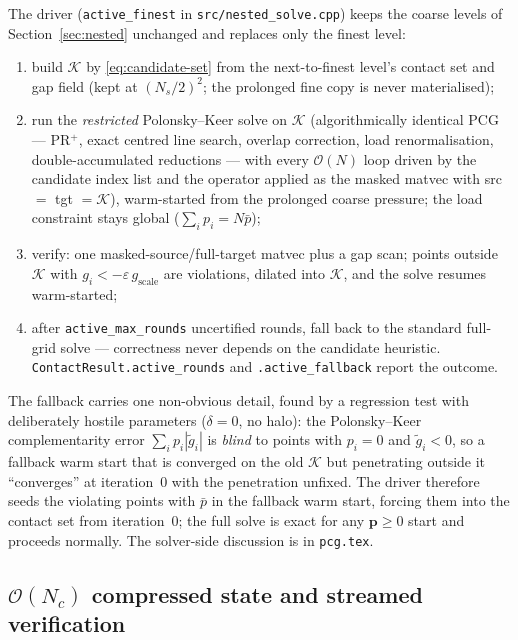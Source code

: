 \documentclass[11pt,a4paper]{article}
\newcommand{\Order}{\mathcal{O}}
\newcommand{\abs}[1]{\left\lvert #1 \right\rvert}
\newcommand{\pp}{\mathbf{p}}
\newcommand{\code}[1]{\texttt{#1}}
\theoremstyle{definition}
\theoremstyle{remark}
\begin{document}
The driver (\code{active\_finest} in \code{src/nested\_solve.cpp}) keeps the
coarse levels of Section~\ref{sec:nested} unchanged and replaces only the
finest level:
\begin{enumerate}
\item build $\mathcal K$ by \eqref{eq:candidate-set} from the next-to-finest
level's contact set and gap field (kept at $(N_s/2)^2$; the prolonged fine
copy is never materialised);
\item run the \emph{restricted} Polonsky--Keer solve on $\mathcal K$
(algorithmically identical PCG --- PR$^+$, exact centred line search,
overlap correction, load renormalisation, double-accumulated reductions ---
with every $\Order(N)$ loop driven by the candidate index list and the
operator applied as the masked matvec with src $=$ tgt $=\mathcal K$),
warm-started from the prolonged coarse pressure; the load constraint stays
global ($\sum_i p_i = N\bar p$);
\item verify: one masked-source/full-target matvec plus a gap scan;
points outside $\mathcal K$ with $g_i<-\varepsilon\,g_{\text{scale}}$ are
violations, dilated into $\mathcal K$, and the solve resumes warm-started;
\item after \code{active\_max\_rounds} uncertified rounds, fall back to the
standard full-grid solve --- correctness never depends on the candidate
heuristic. \code{ContactResult.active\_rounds} and \code{.active\_fallback}
report the outcome.
\end{enumerate}
The fallback carries one non-obvious detail, found by a regression test with
deliberately hostile parameters ($\delta=0$, no halo): the Polonsky--Keer
complementarity error $\sum_i p_i\abs{\tilde g_i}$ is \emph{blind} to points
with $p_i=0$ and $\tilde g_i<0$, so a fallback warm start that is converged
on the old $\mathcal K$ but penetrating outside it ``converges'' at
iteration~0 with the penetration unfixed. The driver therefore seeds the
violating points with $\bar p$ in the fallback warm start, forcing them into
the contact set from iteration~0; the full solve is exact for any
$\pp\ge0$ start and proceeds normally. The solver-side discussion is in
\code{pcg.tex}.

\subsection{$\Order(N_c)$ compressed state and streamed verification}
\label{sec:active-memory}
\end{document}

